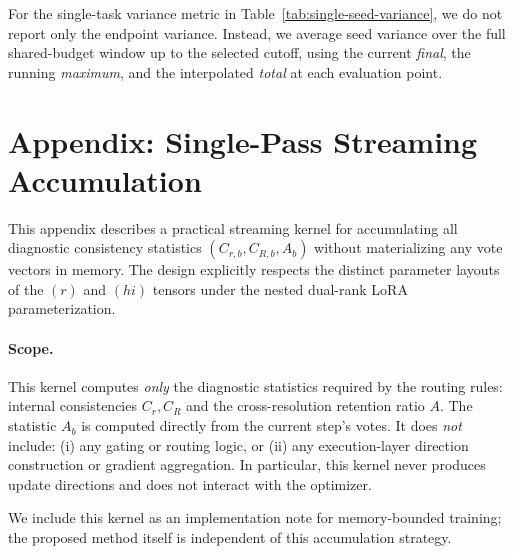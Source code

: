 \documentclass{article}
\begin{document}
For the single-task variance metric in Table~\ref{tab:single-seed-variance}, we
do not report only the endpoint variance. Instead, we average seed variance
over the full shared-budget window up to the selected cutoff, using the
current \textit{final}, the running \textit{maximum}, and the interpolated
\textit{total} at each evaluation point.

\section{Appendix: Single-Pass Streaming Accumulation}
\label{app:kernel}

This appendix describes a practical streaming kernel for accumulating all diagnostic consistency statistics
$(C_{r,b}, C_{R,b}, A_b)$ without materializing any vote vectors in memory.
The design explicitly respects the distinct parameter layouts of the $(r)$ and $(hi)$ tensors
under the nested dual-rank LoRA parameterization.

\paragraph{Scope.}
This kernel computes \emph{only} the diagnostic statistics required by the routing rules:
internal consistencies $C_r, C_R$ and the cross-resolution retention ratio $A$.
The statistic $A_b$ is computed directly from the current step's votes.
It does \emph{not} include:
(i) any gating or routing logic,
or (ii) any execution-layer direction construction or gradient aggregation.
In particular, this kernel never produces update directions and does not interact with the optimizer.

We include this kernel as an implementation note for memory-bounded training;
the proposed method itself is independent of this accumulation strategy.
\end{document}
